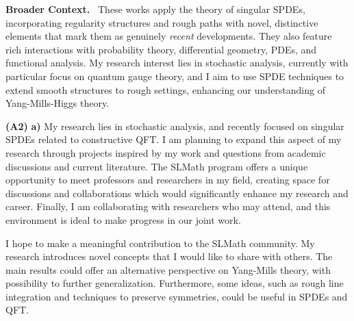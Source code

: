 \documentclass[./Research_statement.tex]{subfiles}
\begin{document}
\vspace{2pt}

\noindent \textbf{Broader Context.}\ 
%
%
These works apply the theory of singular SPDEs, incorporating regularity structures and rough paths with novel, distinctive elements that mark them as genuinely \textit{recent} developments. They also feature rich interactions with probability theory, differential geometry, PDEs, and functional analysis. My research interest lies in stochastic analysis, currently with particular focus on quantum gauge theory, and I aim to use SPDE techniques to extend smooth structures to rough settings, enhancing our understanding of Yang-Mills-Higgs theory. 
%
\newpage 

\noindent \textbf{(A2)} \textbf{a)} 
My research lies in stochastic analysis, and recently focused on singular SPDEs related to constructive QFT. I am planning to expand this aspect of my research through projects inspired by my work and  questions from academic discussions and current literature. The SLMath program offers a unique opportunity to meet professors and researchers in my field, creating space for discussions and collaborations which would significantly enhance my research and career. Finally, I am collaborating with researchers who may attend, and this environment is ideal to make progress in our joint work. 

I hope to make a meaningful contribution to the SLMath community. My research introduces novel concepts that I would like to share with others. The main results could offer an alternative perspective on Yang-Mills theory, with possibility to further generalization. Furthermore, some ideas, such as rough line integration and techniques to preserve symmetries, could be useful in SPDEs and QFT.



\end{document}
